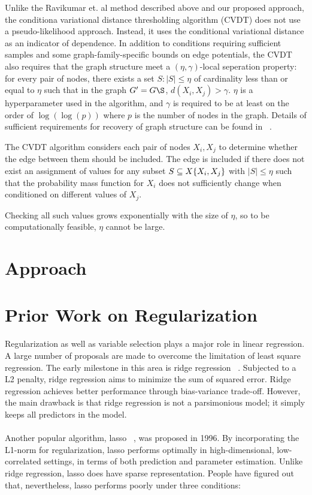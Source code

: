 \documentclass[11pt]{article}
\begin{document}
Unlike the Ravikumar et. al method described above and our proposed approach, the conditiona variational distance thresholding algorithm (CVDT) \cite{anandkumar2012high} does not use a pseudo-likelihood approach.  Instead, it uses the conditional variational distance as an indicator of dependence. In addition to conditions requiring sufficient samples and some graph-family-specific bounds on edge potentials, the CVDT also requires that the graph structure meet a $(\eta,\gamma)$-local seperation property: for every pair of nodes, there exists a set $S: |S| \leq \eta$ of cardinality less than or equal to $\eta$ such that in the graph $G' = G\S$, $d(X_i,X_j) > \gamma$. $\eta$ is a hyperparameter used in the algorithm, and $\gamma$ is required to be at least on the order of $\log(\log(p))$ where $p$ is the number of nodes in the graph. Details of sufficient requirements for recovery of graph structure can be found in ~\cite{anandkumar2012high}.

The CVDT algorithm considers each pair of nodes $X_i,X_j$ to determine whether the edge between them should be included.  The edge is included if there does not exist an assignment of values for any subset $S \subseteq X\\\{X_i,X_j\}$ with $|S| \leq \eta$ such that the probability mass function for $X_i$ does not sufficiently change when conditioned on different values of $X_j$.

Checking all such values grows exponentially with the size of $\eta$, so to be computationally feasible, $\eta$ cannot be large. 
\section{Approach}

\section{Prior Work on Regularization}

Regularization as well as variable selection plays a major role in linear regression. A large number of proposals are made to overcome the limitation of least square regression. The early milestone in this area is ridge regression ~\cite{AEHoerl1970ridge}. Subjected to a L2 penalty, ridge regression aims to minimize the sum of squared error. Ridge regression achieves better performance through bias-variance trade-off. However, the main drawback is that ridge regression is not a parsimonious model; it simply keeps all predictors in the model. 
\\ \\
Another popular algorithm, lasso ~\cite{tibshirani1996regression}, was proposed in 1996. By incorporating the L1-norm for regularization, lasso performs optimally in high-dimensional, low-correlated settings, in terms of both prediction and parameter estimation. Unlike ridge regression, lasso does have sparse representation. People have figured out that, nevertheless, lasso performs poorly under three conditions:
\end{document}
